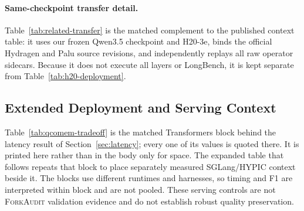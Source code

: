 \documentclass{article}
\newcommand{\method}{\textsc{ForkAudit}}
\begin{document}
\paragraph{Same-checkpoint transfer detail.}
Table~\ref{tab:related-transfer} is the matched complement to the published
context table: it uses our frozen Qwen3.5 checkpoint and H20-3e, binds the
official Hydragen and Palu source revisions, and independently replays all raw
operator sidecars.  Because it does not execute all layers or LongBench, it is
kept separate from Table~\ref{tab:h20-deployment}.


\subsection{Extended Deployment and Serving Context}
\label{app:illustrative-store}

Table~\ref{tab:qcomem-tradeoff} is the matched Transformers block behind the
latency result of Section~\ref{sec:latency}; every one of its values is quoted
there.  It is printed here rather than in the body only for space.  The expanded
table that follows repeats that block to place separately measured SGLang/HYPIC
context beside it.  The blocks use different runtimes and harnesses, so timing
and F1 are interpreted within block and are not pooled.  These serving controls
are not \method{} validation evidence and do not establish robust quality
preservation.




\end{document}
